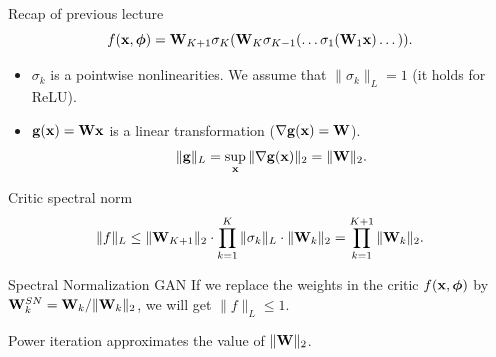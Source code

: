 

\begin{frame}
\titlepage
\end{frame}
\begin{frame}{Recap of previous lecture}
	\vspace{-0.3cm}
	\[
		f(\mathbf{x}, \boldsymbol{\phi}) = \mathbf{W}_{K+1} \sigma_K (\mathbf{W}_K \sigma_{K-1}(\dots \sigma_1(\mathbf{W}_1 \mathbf{x}) \dots)).
	\]
	\vspace{-0.3cm}
	\begin{itemize}
		\item $\sigma_k$ is a pointwise nonlinearities. We assume that $\| \sigma_k \|_L = 1$ (it holds for ReLU).
		\item $\mathbf{g}(\mathbf{x}) = \mathbf{W} \mathbf{x}$ is a linear transformation ($\nabla \mathbf{g}(\mathbf{x}) = \mathbf{W}$).
		\[
			\| \mathbf{g} \|_L = \sup_{\mathbf{x}} \| \nabla \mathbf{g}(\mathbf{x}) \|_2 = \|\mathbf{W}\|_2.
		\]
	\end{itemize}
	\vspace{-0.3cm}
	\begin{block}{Critic spectral norm}
		\vspace{-0.3cm}
		\[
			\| f \|_L \leq \| \mathbf{W}_{K+1}\|_2 \cdot \prod_{k=1}^K  \| \sigma_k \|_L \cdot \| \mathbf{W}_k \|_2 = \prod_{k=1}^{K+1} \|\mathbf{W}_k\|_2.
		\]
		\vspace{-0.2cm}
	\end{block}
	\begin{block}{Spectral Normalization GAN}
	If we replace the weights in the critic $f(\mathbf{x}, \boldsymbol{\phi})$ by $\mathbf{W}^{SN}_k = \mathbf{W}_k / \|\mathbf{W}_k\|_2$, we will get $\| f\|_L \leq 1.$ \\
	\end{block}
	 Power iteration approximates the value of $\|\mathbf{W}\|_2$.
	

\end{frame}
